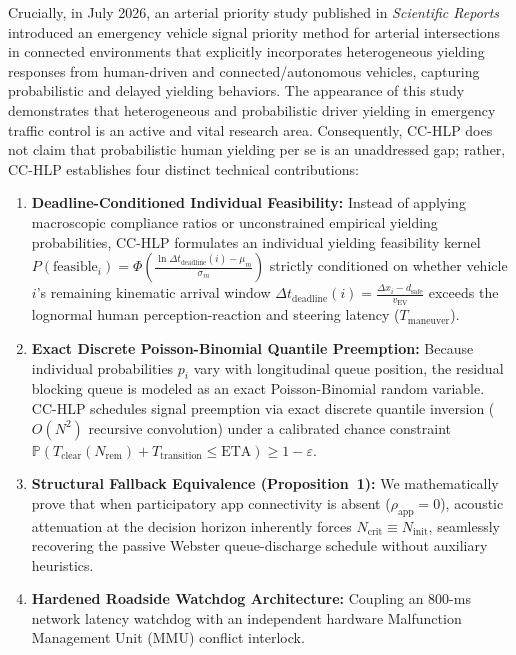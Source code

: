 \documentclass[journal,10pt,twocolumn]{IEEEtran}
\begin{document}
Crucially, in July 2026, an arterial priority study published in \emph{Scientific Reports}~\cite{scirep2026evp} introduced an emergency vehicle signal priority method for arterial intersections in connected environments that explicitly incorporates heterogeneous yielding responses from human-driven and connected/autonomous vehicles, capturing probabilistic and delayed yielding behaviors. The appearance of this study demonstrates that heterogeneous and probabilistic driver yielding in emergency traffic control is an active and vital research area. Consequently, CC-HLP does not claim that probabilistic human yielding per se is an unaddressed gap; rather, CC-HLP establishes four distinct technical contributions:
\begin{enumerate}
    \item \textbf{Deadline-Conditioned Individual Feasibility:} Instead of applying macroscopic compliance ratios or unconstrained empirical yielding probabilities, CC-HLP formulates an individual yielding feasibility kernel $P(\text{feasible}_i) = \Phi\left(\frac{\ln \Delta t_{\text{deadline}}(i) - \mu_m}{\sigma_m}\right)$ strictly conditioned on whether vehicle $i$'s remaining kinematic arrival window $\Delta t_{\text{deadline}}(i) = \frac{\Delta x_i - d_{\text{safe}}}{v_{\text{EV}}}$ exceeds the lognormal human perception-reaction and steering latency ($T_{\text{maneuver}}$).
    \item \textbf{Exact Discrete Poisson-Binomial Quantile Preemption:} Because individual probabilities $p_i$ vary with longitudinal queue position, the residual blocking queue is modeled as an exact Poisson-Binomial random variable. CC-HLP schedules signal preemption via exact discrete quantile inversion ($O(N^2)$ recursive convolution) under a calibrated chance constraint $\mathbb{P}(T_{\text{clear}}(N_{\text{rem}}) + T_{\text{transition}} \le \text{ETA}) \ge 1 - \varepsilon$.
    \item \textbf{Structural Fallback Equivalence (Proposition~1):} We mathematically prove that when participatory app connectivity is absent ($\rho_{\text{app}} = 0$), acoustic attenuation at the decision horizon inherently forces $N_{\text{crit}} \equiv N_{\text{init}}$, seamlessly recovering the passive Webster queue-discharge schedule without auxiliary heuristics.
    \item \textbf{Hardened Roadside Watchdog Architecture:} Coupling an 800-ms network latency watchdog with an independent hardware Malfunction Management Unit (MMU) conflict interlock.
\end{enumerate}
\end{document}

